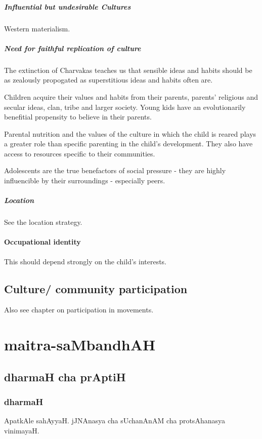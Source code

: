 \documentclass[oneside, article]{memoir}
\begin{document}
\subsubsection{Influential but undesirable Cultures}
Western materialism.

\subsubsection{Need for faithful replication of culture}
The extinction of Charvakas teaches us that sensible ideas and habits should be as zealously propogated as superstitious ideas and habits often are.

Children acquire their values and habits from their parents, parents' religious and secular ideas, clan, tribe and larger society. Young kids have an evolutionarily benefitial propensity to believe in their parents.

Parental nutrition and the values of the culture in which the child is reared plays a greater role than specific parenting in the child's development. They also have access to resources specific to their communities.

Adolescents are the true benefactors of social pressure - they are highly influencible by their surroundings - especially peers.


\subsubsection{Location}
See the location strategy.

\subsection{Occupational identity}
This should depend strongly on the child's interests.

\chapter{Culture/ community participation}
Also see chapter on participation in movements. \tbc

\part{maitra-saMbandhAH}
\chapter{dharmaH cha prAptiH}
\section{dharmaH}
ApatkAle sahAyyaH. jJNAnasya cha sUchanAnAM cha protsAhanasya vinimayaH.
\end{document}
